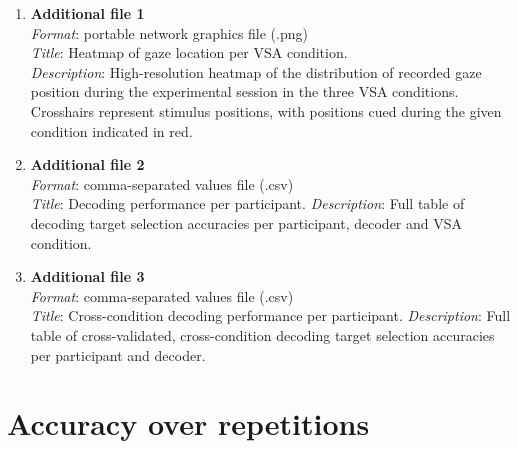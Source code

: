 \documentclass{article}
\begin{document}
\begin{enumerate}
	\item \textbf{Additional file 1} \\
	      \emph{Format}: portable network graphics file (.png) \\
	      \emph{Title}: Heatmap of gaze location per VSA condition.\\
	      \emph{Description}: High-resolution heatmap of the distribution of recorded
	      gaze position during the experimental session in the three VSA
	      conditions.
	      Crosshairs represent stimulus positions, with positions
	      cued during the given condition indicated in red.
	\item \textbf{Additional file 2} \\
	      \emph{Format}: comma-separated values file (.csv) \\
	      \emph{Title}: Decoding performance per participant.
	      \emph{Description}: Full table of decoding target selection accuracies
	      per participant, decoder and VSA condition.
	\item \textbf{Additional file 3} \\
	      \emph{Format}: comma-separated values file (.csv) \\
	      \emph{Title}: Cross-condition decoding performance per participant.
	      \emph{Description}: Full table of cross-validated, cross-condition
	      decoding target selection accuracies per participant and decoder.
\end{enumerate}


\printbibliography%


\appendix





\section{Accuracy over repetitions}
\label{app:repetitions}
\begin{table}[h]
	
	\caption{Accuracy of the \ac{tlda} decoder when averaging over multiple repetitions.}
\end{table}

\setcounter{table}{0}
\renewcommand{\thetable}{A\arabic{table}}
\end{document}
